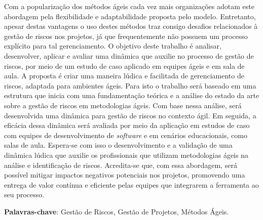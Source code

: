 \documentclass[
	12pt,
	openright,
	twoside,
	a4paper,
	english,
	brazil
	]{abntex2}
\begin{document}
\frenchspacing


\imprimircapa


\imprimirfolhaderosto*


\setlength{\absparsep}{18pt}
\begin{resumo}
  Com a popularização dos métodos ágeis cada vez mais organizações adotam este abordagem pela flexibilidade  e adaptabilidade proposta pelo modelo. Entretanto, apesar destas vantagens o uso destes métodos traz consigo desafios relacionados à gestão de riscos nos projetos, já que frequentemente não possuem um processo explícito para tal gerenciamento.
  O objetivo deste trabalho é analisar, desenvolver, aplicar e avaliar uma dinâmica que auxilie no processo de gestão de riscos, por meio de um estudo de caso aplicado em equipes ágeis e em sala de aula. A proposta é criar uma maneira lúdica e facilitada de gerenciamento de riscos, adaptada para ambientes ágeis.
  Para isto o trabalho será baseado em uma estrutura que inicia com uma fundamentação teórica e a análise do estado da arte sobre a gestão de riscos em metodologias ágeis. Com base nessa análise, será desenvolvida uma dinâmica para gestão de riscos no contexto ágil. Em seguida, a eficácia dessa dinâmica será avaliada por meio da aplicação em estudos de caso com equipes de desenvolvimento de \textit{software} e em cenários educacionais, como salas de aula.
  Espera-se com isso o desenvolvimento e a validação de uma dinâmica lúdica que auxilie os profissionais que utilizam metodologias ágeis na análise e identificação de riscos. Acredita-se que, com essa abordagem, será possível mitigar impactos negativos potenciais nos projetos, promovendo uma entrega de valor contínua e eficiente pelas equipes que integrarem a ferramenta ao seu processo. 
  \vspace{\onelineskip}

  \noindent\textbf{Palavras-chave}: Gestão de Riscos, Gestão de Projetos, Métodos Ágeis.

\end{resumo}

\end{document}

